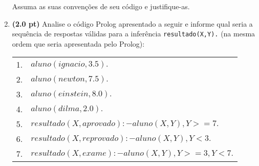 \documentclass[a4paper,12pt]{article}
\begin{document}
\begin{enumerate}
Assuma as suas convenções de seu código e justifique-as.

\item {\bf (2.0 pt)} Analise o código Prolog apresentado a seguir e informe qual seria a sequência de respostas válidas para a inferência {\tt resultado(X,Y).} {\small (na mesma ordem que seria apresentada pelo Prolog)}:

\begin{center}
\begin{tabular}{ll}
 \hline \hline
    1. &  $aluno(ignacio,3.5).$ \\
    2. &  $aluno(newton,7.5).$ \\
    3. &  $aluno(einstein, 8.0).$ \\
    4. &  $aluno(dilma, 2.0).$\\
    5. &  $resultado(X,aprovado) :- aluno(X,Y), Y >= 7 .$ \\
    6. &  $resultado(X,reprovado) :- aluno(X,Y), Y < 3 .$ \\
    7. &  $resultado(X,exame) :- aluno(X,Y), Y >= 3 , Y < 7 .$ \\ \hline \hline
 \end{tabular}
\end{center}

\end{enumerate}
\end{document}
